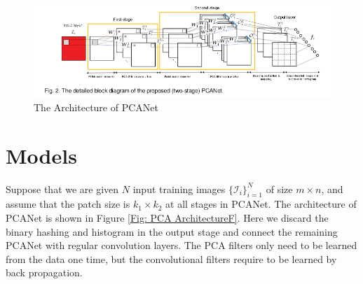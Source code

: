 \documentclass{article} %
\begin{document}

\begin{figure}[h] \label{Fig: PCA Architecture}
\vspace{-15pt} \centering
\includegraphics[scale=1.7,width=14cm]{pcanetstructure.png}
\vspace{-20pt}\caption{The Architecture of PCANet}
\end{figure}


\section{Models} 
Suppose that we are given $N$ input training images $\{\mathcal{I}_i\}_{i=1}^N $ of size $m \times n$, and assume that the patch size is $k_1 \times k_2$ at all stages in PCANet. The architecture of PCANet is shown in Figure \ref{Fig: PCA ArchitectureF}. Here we discard the binary hashing and histogram in the output stage and connect the remaining PCANet with regular convolution layers. The PCA filters only need to be learned from the data one time, but the convolutional filters require to be learned by back propagation. 
\end{document}

